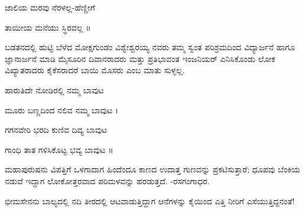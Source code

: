 \vspace{2.5pt plus 3pt minus 0.5pt}\noindent\hspace*{1.2em}\hspace{0.55em}ಜಾಲಿಯ ಮರವು ನೆರಳಲ್ಲ-ಹೆಣ್ಣೀಗೆ\par

\begin{kbvverse}
\noindent ತಾಯೀಯ ಮನೆಯು ಸ್ಥಿರವಲ್ಲ ॥
\end{kbvverse}

\vspace{2.5pt plus 3pt minus 0.5pt}\noindent\hspace*{1.2em}\hspace{0.55em}ಬಡತನದಲ್ಲಿ ಹುಟ್ಟಿ ಬೆಳೆದ ಮೋಕ್ಷಗುಂಡಂ ವಿಶ್ವೇಶ್ವರಯ್ಯ ನವರು ತಮ್ಮ ಸ್ವಂತ ಪರಿಶ್ರಮದಿಂದ ವಿದ್ಯಾರ್ಜನೆ ಹಾಗೂ ಜ್ಞಾನಾರ್ಜನೆ ಮಾಡಿ ಮೈಸೂರಿನ ದಿವಾನರಾದರು ಮತ್ತು ಪ್ರತಿಭಾವಂತ ಇಂಜನಿಯರ್‌ ಎನಿಸಿಕೊಂಡು ಲೋಕ ವಿಖ್ಯಾತರಾದರು ಕೈಕೆಸರಾದರೆ ಬಾಯಿ ಮೊಸರು ಎಂಬ ಮಾತು ಸುಳ್ಳಲ್ಲ.\par

\vspace{2.5pt plus 3pt minus 0.5pt}\noindent\hspace*{1.2em}\hspace{0.55em}ಹಾರುತಿದೇ ನೋಡಿರಲ್ಲಿ ನಮ್ಮ ಬಾವುಟ\par

\begin{kbvverse}
\noindent ಮೂರು ಬಣ್ಣದಿಂದ ನಲಿವ ನಮ್ಮ ಬಾವುಟ ।
\end{kbvverse}

\indent ಗಗನವೇರಿ ಭರದಿ ಕುಣಿವ ದಿವ್ಯ ಬಾವುಟ\par

\begin{kbvverse}
\noindent ಗಾಂಧಿ ತಾತ ಗಳಿಸಿಕೊಟ್ಟ ಭವ್ಯ ಬಾವುಟ ॥
\end{kbvverse}

\vspace{2.5pt plus 3pt minus 0.5pt}\noindent\hspace*{1.2em}\hspace{0.55em}ಮಹಾಪುರುಷನು ವಿಪತ್ತಿಗೆ ಒಳಗಾದಾಗ ಹಿಂದೆಂದೂ ಕಾಣದ ಉದಾತ್ತ ಗುಣವನ್ನು ಪ್ರಕಟಿಸುತ್ತಾರೆ; ಧೂಪವು ಬೆಂಕಿಯ ನಡುವೆ ಇದ್ದಾಗ ಲೋಕೋತ್ತರವಾದ ಪರಿಮಳವನ್ನು ಹರಡುತ್ತದೆ. -ರಸಗಂಗಾಧರ.\par

\vspace{2.5pt plus 3pt minus 0.5pt}\noindent\hspace*{1.2em}\hspace{0.55em}ಭೀಮಸೇನನು ಬಾಲ್ಯದಲ್ಲಿ ನದಿ ತೀರದಲ್ಲಿ ಆಟವಾಡುತ್ತಿದ್ದಾಗ ಆನೆಗಳನ್ನು ಕೈಯಿಂದ ಎತ್ತಿ ನೀರಿಗೆ ಎಸೆಯುತ್ತಿದ್ದನಂತೆ!\par

